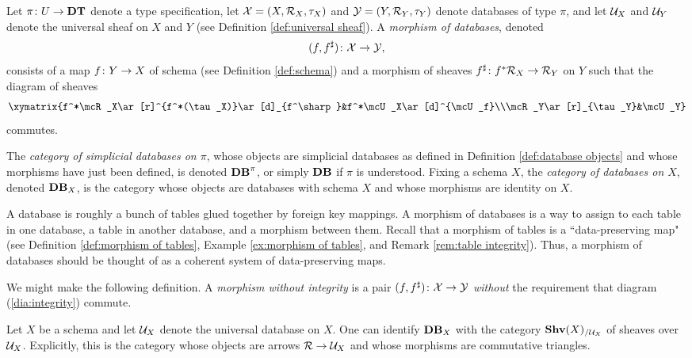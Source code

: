 \documentclass{amsart}
\begin{document}
\begin{definition}\label{def:database morphisms}

Let $\pi\colon U\rightarrow{\bf DT}$ denote a type specification, let $\mathcal{X}=(X,\mathcal{R}_X,\tau_X)$ and $\mathcal{Y}=(Y,\mathcal{R}_Y,\tau_Y)$ denote databases of type $\pi$, and let $\mathcal{U}_X$ and $\mathcal{U}_Y$ denote the universal sheaf on $X$ and $Y$ (see Definition \ref{def:universal sheaf}).  A {\em morphism of databases}, denoted $$(f,f^\sharp)\colon\mathcal{X}\rightarrow\mathcal{Y},$$ consists of a map $f\colon Y\rightarrow X$ of schema (see Definition \ref{def:schema}) and a morphism of sheaves $f^\sharp\colon f^*\mathcal{R}_X\rightarrow\mathcal{R}_Y$ on $Y$ such that the diagram of sheaves \begin{eqnarray}\label{dia:integrity}\xymatrix{f^*\mcR_X\ar[r]^{f^*(\tau_X)}\ar[d]_{f^\sharp}&f^*\mcU_X\ar[d]^{\mcU_f}\\\mcR_Y\ar[r]_{\tau_Y}&\mcU_Y}\end{eqnarray} commutes.

The {\em category of simplicial databases on $\pi$}, whose objects are simplicial databases as defined in Definition \ref{def:database objects} and whose morphisms have just been defined, is denoted ${\bf DB}^\pi$, or simply ${\bf DB}$ if $\pi$ is understood.  Fixing a schema $X$, the {\em category of databases on $X$}, denoted ${\bf DB}_X$, is the category whose objects are databases with schema $X$ and whose morphisms are identity on $X$.  

\end{definition}

\begin{remark}\label{rem:data integrity}

A database is roughly a bunch of tables glued together by foreign key mappings.  A morphism of databases is a way to assign to each table in one database, a table in another database, and a morphism between them.  Recall that a morphism of tables is a ``data-preserving map" (see Definition \ref{def:morphism of tables}, Example \ref{ex:morphism of tables}, and Remark \ref{rem:table integrity}).  Thus, a morphism of databases should be thought of as a coherent system of data-preserving maps.

We might make the following definition.  A {\em morphism without integrity} is a pair $(f,f^\sharp)\colon\mathcal{X}\rightarrow\mathcal{Y}$ {\em without} the requirement that diagram (\ref{dia:integrity}) commute.



\end{remark}

\begin{remark}\label{rem:data_X}

Let $X$ be a schema and let $\mathcal{U}_X$ denote the universal database on $X$.  One can identify ${\bf DB}_X$ with the category ${\bf Shv}(X)_{/\mathcal{U}_X}$ of sheaves over $\mathcal{U}_X$.  Explicitly, this is the category whose objects are arrows $\mathcal{R}\rightarrow\mathcal{U}_X$ and whose morphisms are commutative triangles.

\end{remark}
\end{document}
